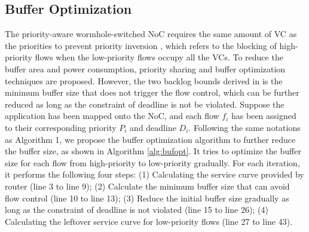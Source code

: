 \documentclass[10pt,journal]{IEEEtran}
\begin{document}
\subsection{Buffer Optimization}\label{bufferopt}
The priority-aware wormhole-switched NoC \cite{Shi:2008:RCA:1397757.1397996} requires the same amount of VC as the priorities to prevent priority inversion \cite{707545}, which refers to the blocking of high-priority flows when the low-priority flows occupy all the VCs. To reduce the buffer area and power consumption, priority sharing \cite{5161497} and buffer optimization \cite{189} techniques are proposed. However, the two backlog bounds derived in \cite{189} is the minimum buffer size that does not trigger the flow control, which can be further reduced as long as the constraint of deadline is not be violated. Suppose the application has been mapped onto the NoC, and each flow $f_i$ has been assigned to their corresponding priority $P_i$ and deadline $D_i$. Following the same notations as Algorithm 1, we propose the buffer optimization algorithm to further reduce the buffer size, as shown in Algorithm \ref{alg:bufopt}. It tries to optimize the buffer size for each flow from high-priority to low-priority gradually. For each iteration, it performs the following four steps: (1) Calculating the service curve provided by router (line 3 to line 9); (2) Calculate the minimum buffer size that can avoid flow control (line 10 to line 13); (3) Reduce the initial buffer size gradually as long as the constraint of deadline is not violated (line 15 to line 26); (4) Calculating the leftover service curve for low-priority flows (line 27 to line 43).
\end{document}
